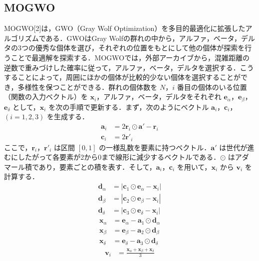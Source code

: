 \documentclass[a4paper, twocolumn]{ltjsarticle}
\begin{document}
\subsection{MOGWO}
MOGWO[2]は，GWO（Gray Wolf Optimization）を多目的最適化に拡張したアルゴリズムである．GWOはGray Wolfの群れの中から，アルファ，ベータ，デルタの3つの優秀な個体を選び，それぞれの位置をもとにして他の個体が探索を行うことで最適解を探索する．MOGWOでは，外部アーカイブから，混雑距離の逆数で重みづけした確率に従って，アルファ，ベータ，デルタを選択する．こうすることによって，周囲にほかの個体が比較的少ない個体を選択することができ，多様性を保つことができる．群れの個体数を $N$，$i$ 番目の個体のいる位置（関数の入力ベクトル）を $\boldsymbol{x}_i$，アルファ，ベータ，デルタをそれぞれ $\boldsymbol{e}_\alpha$，$\boldsymbol{e}_\beta$，$\boldsymbol{e}_\delta$ として，$\boldsymbol{x}_i$ を次の手順で更新する．まず，次のようにベクトル $\boldsymbol{a}_i$，$\boldsymbol{c}_i$，$(i = 1, 2, 3)$ を生成する．
\begin{align}
    \boldsymbol{a}_i &= 2\boldsymbol{r}_i\odot\boldsymbol{a'}-\boldsymbol{r}_i\\
    \boldsymbol{c}_i &= 2\boldsymbol{r'}_i
\end{align}
ここで，$\boldsymbol{r}_i$，$\boldsymbol{r'}_i$ は区間 $[0, 1]$ の一様乱数を要素に持つベクトル．$\boldsymbol{a'}$ は世代が進むにしたがって各要素が2から0まで線形に減少するベクトルである．$\odot$ はアダマール積であり，要素ごとの積を表す．そして，$\boldsymbol{a}_i$，$\boldsymbol{c}_i$ を用いて，$\boldsymbol{x}_i$ から $\boldsymbol{v}_i$ を計算する．
\begin{align}
    \boldsymbol{d}_\alpha &= |\boldsymbol{c}_1\odot\boldsymbol{e}_\alpha-\boldsymbol{x}_i|\nonumber\\
    \boldsymbol{d}_\beta &= |\boldsymbol{c}_2\odot\boldsymbol{e}_\beta-\boldsymbol{x}_i|\\
    \boldsymbol{d}_\delta &= |\boldsymbol{c}_3\odot\boldsymbol{e}_\delta-\boldsymbol{x}_i|\nonumber
\end{align}
\begin{align}
    \boldsymbol{x}_\alpha &= \boldsymbol{e}_\alpha-\boldsymbol{a}_1\odot\boldsymbol{d}_\alpha\nonumber\\
    \boldsymbol{x}_\beta &= \boldsymbol{e}_\beta-\boldsymbol{a}_2\odot\boldsymbol{d}_\beta\\
    \boldsymbol{x}_\delta &= \boldsymbol{e}_\delta-\boldsymbol{a}_3\odot\boldsymbol{d}_\delta\nonumber
\end{align}
\begin{align}
    \boldsymbol{v}_i &= \frac{\boldsymbol{x}_\alpha+\boldsymbol{x}_\beta+\boldsymbol{x}_\delta}{3}
\end{align}
\end{document}
